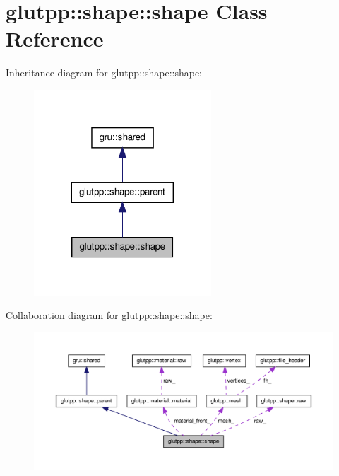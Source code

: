 \hypertarget{classglutpp_1_1shape_1_1shape}{\section{glutpp\-:\-:shape\-:\-:shape \-Class \-Reference}
\label{classglutpp_1_1shape_1_1shape}
}


\-Inheritance diagram for glutpp\-:\-:shape\-:\-:shape\-:\nopagebreak
\begin{figure}[H]
\begin{center}
\leavevmode
\includegraphics[width=188pt]{classglutpp_1_1shape_1_1shape__inherit__graph}
\end{center}
\end{figure}


\-Collaboration diagram for glutpp\-:\-:shape\-:\-:shape\-:\nopagebreak
\begin{figure}[H]
\begin{center}
\leavevmode
\includegraphics[width=350pt]{classglutpp_1_1shape_1_1shape__coll__graph}
\end{center}
\end{figure}
